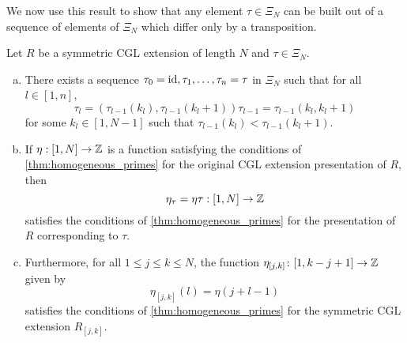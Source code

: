 We now use this result to show that any element $\tau \in \Xi_N$ can be built out of a
sequence of elements of $\Xi_N$ which differ only by a transposition.
\begin{proposition}\label{prop:eta_invariance}
	Let $R$ be a symmetric CGL extension of length $N$ and $\tau \in \Xi_N$.
	\begin{enumerate}[(a)]
		\item There exists a sequence $\tau_0 = \operatorname{id}, \tau_1, \dots, \tau_n = \tau$ in $\Xi_N$ such
		      that for all $l \in [1, n]$,
		      \begin{equation*}
			      \tau_l = (\tau_{l-1}(k_l), \tau_{l-1}(k_l + 1))\tau_{l-1} = \tau_{l-1}(k_l, k_l + 1)
		      \end{equation*}
		      for some $k_l \in [1, N-1]$ such that $\tau_{l-1}(k_l) < \tau_{l-1}(k_l + 1)$.
		\item If $\eta : [1, N] \to \mathbb{Z}$ is a function satisfying the conditions of
		      \cref{thm:homogeneous_primes} for the original CGL extension presentation of $R$, then
		      \begin{equation*}
			      \eta_\tau = \eta \tau : [1, N] \to \mathbb{Z}
		      \end{equation*}
		      satisfies the conditions of \cref{thm:homogeneous_primes} for the presentation of $R$
		      corresponding to $\tau$.

		\item Furthermore, for all $1 \leq j \leq k \leq N$, the function $\eta_{[j, k]} \colon [1,
				      k-j+1] \to \mathbb{Z}$ given by
		      \begin{equation*}
			      \eta_{[j,k]}(l) = \eta(j+l-1)
		      \end{equation*}
		      satisfies the conditions of \cref{thm:homogeneous_primes} for the symmetric CGL
		      extension $R_{[j,k]}$.
	\end{enumerate}
\end{proposition}
